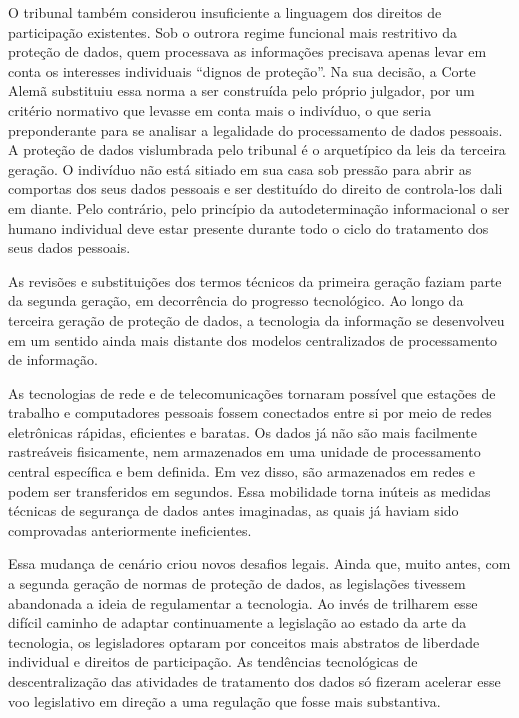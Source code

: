 O tribunal também considerou insuficiente a linguagem dos direitos de
participação existentes. Sob o outrora regime funcional mais restritivo
da proteção de dados, quem processava as informações precisava apenas
levar em conta os interesses individuais ``dignos de proteção''. Na sua
decisão, a Corte Alemã substituiu essa norma a ser construída pelo
próprio julgador, por um critério normativo que levasse em conta mais o
indivíduo, o que seria preponderante para se analisar a legalidade do
processamento de dados pessoais. A proteção de dados vislumbrada pelo
tribunal é o arquetípico da leis da terceira geração. O indivíduo não
está sitiado em sua casa sob pressão para abrir as comportas dos seus
dados pessoais e ser destituído do direito de controla-los dali em
diante. Pelo contrário, pelo princípio da autodeterminação informacional
o ser humano individual deve estar presente durante todo o ciclo do
tratamento dos seus dados pessoais.

As revisões e substituições dos termos técnicos da primeira geração
faziam parte da segunda geração, em decorrência do progresso
tecnológico. Ao longo da terceira geração de proteção de dados, a
tecnologia da informação se desenvolveu em um sentido ainda mais
distante dos modelos centralizados de processamento de informação.

As tecnologias de rede e de telecomunicações tornaram possível que
estações de trabalho e computadores pessoais fossem conectados entre si
por meio de redes eletrônicas rápidas, eficientes e baratas. Os dados já
não são mais facilmente rastreáveis fisicamente, nem armazenados em uma
unidade de processamento central específica e bem definida. Em vez
disso, são armazenados em redes e podem ser transferidos em segundos.
Essa mobilidade torna inúteis as medidas técnicas de segurança de dados
antes imaginadas, as quais já haviam sido comprovadas anteriormente
ineficientes.

Essa mudança de cenário criou novos desafios legais. Ainda que, muito
antes, com a segunda geração de normas de proteção de dados, as
legislações tivessem abandonada a ideia de regulamentar a tecnologia. Ao
invés de trilharem esse difícil caminho de adaptar continuamente a
legislação ao estado da arte da tecnologia, os legisladores optaram por
conceitos mais abstratos de liberdade individual e direitos de
participação. As tendências tecnológicas de descentralização das
atividades de tratamento dos dados só fizeram acelerar esse voo
legislativo em direção a uma regulação que fosse mais substantiva.

